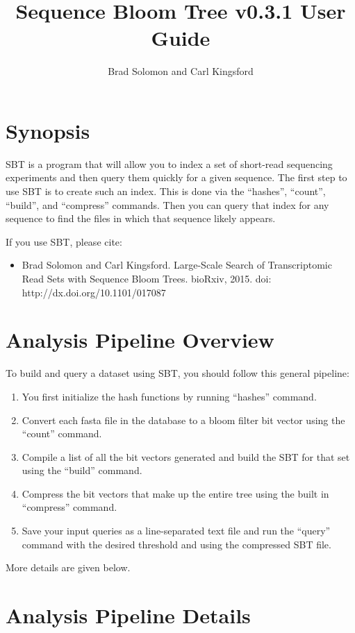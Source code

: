 \documentclass{article}
\title{Sequence Bloom Tree v0.3.1 User Guide}
\author{Brad Solomon and Carl Kingsford}
\begin{document}
\maketitle

\section{Synopsis}

SBT is a program that will allow you to index a set of short-read sequencing experiments and then query them quickly for a given sequence. The first step to use SBT is to create such an index. This is done via the ``hashes'', ``count'',  ``build'', and ``compress'' commands. Then you can query that index for any sequence to find the files in which that sequence likely appears.

If you use SBT, please cite:
\begin{itemize}
\item Brad Solomon and Carl Kingsford.
Large-Scale Search of Transcriptomic Read Sets with Sequence Bloom Trees. 
bioRxiv, 2015. doi: http://dx.doi.org/10.1101/017087
\end{itemize}

\section{Analysis Pipeline Overview}

To build and query a dataset using SBT, you should follow this general pipeline:
\begin{enumerate}
\item You first initialize the hash functions by running ``hashes'' command. 
\item Convert each fasta file in the database to a bloom filter bit vector using the  ``count'' command. 
\item Compile a list of all the bit vectors generated and build the SBT for that set using the ``build'' command.
\item Compress the bit vectors that make up the entire tree using the built in ``compress'' command.
\item Save your input queries as a line-separated text file and run the ``query'' command with the desired threshold and using the compressed SBT file.
\end{enumerate}
More details are given below.

\section{Analysis Pipeline Details}
\end{document}
